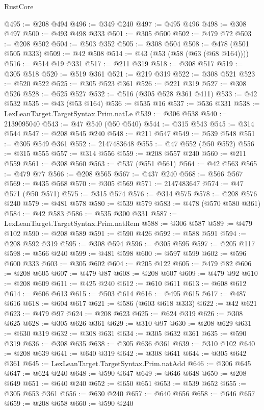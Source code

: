 \begin{lexlean}{RustCore}
\begin{coremodule}
@495 := @208 @494
@496 := @349 @240
@497 := @495 @496
@498 := @308 @497
@500 := @493 @498 @333
@501 := @305 @500
@502 := @479 @72
@503 := @208 @502
@504 := @503 @352
@505 := @308 @504
@508 := @478 (@501 @505 @333)
@509 := @42 @508
@514 := @43 (@53 (@58 (@63 (@68 @164))))
@516 := @514 @19 @331
@517 := @211 @319
@518 := @308 @517
@519 := @305 @518
@520 := @519 @361
@521 := @219 @319
@522 := @308 @521
@523 := @520 @522
@525 := @305 @523 @361
@526 := @221 @319
@527 := @308 @526
@528 := @525 @527
@532 := @516 (@305 @528 @361 @411)
@533 := @42 @532
@535 := @43 (@53 @164)
@536 := @535 @16
@537 := @536 @331
@538 := LexLeanTarget.TargetSyntax.Prim.natLe
@539 := @306 @538
@540 := 2139095040
@543 := @47 @540 (@50 @540)
@544 := @315 @543
@545 := @314 @544
@547 := @208 @545 @240
@548 := @211 @547
@549 := @539 @548
@551 := @305 @549 @361
@552 := 2147483648
@555 := @47 @552 (@50 @552)
@556 := @315 @555
@557 := @314 @556
@559 := @208 @557 @240
@560 := @211 @559
@561 := @308 @560
@563 := @537 (@551 @561)
@564 := @42 @563
@565 := @479 @77
@566 := @208 @565
@567 := @437 @240
@568 := @566 @567
@569 := @435 @568
@570 := @305 @569
@571 := 2147483647
@574 := @47 @571 (@50 @571)
@575 := @315 @574
@576 := @314 @575
@578 := @208 @576 @240
@579 := @481 @578
@580 := @539 @579
@583 := @478 (@570 @580 @361)
@584 := @42 @583
@586 := @535 @300 @331
@587 := LexLeanTarget.TargetSyntax.Prim.natRem
@588 := @306 @587
@589 := @479 @102
@590 := @208 @589
@591 := @590 @426
@592 := @588 @591
@594 := @208 @592 @319
@595 := @308 @594
@596 := @305 @595
@597 := @205 @117
@598 := @566 @240
@599 := @481 @598
@600 := @597 @599
@602 := @596 @600 @333
@603 := @305 @602
@604 := @205 @122
@605 := @479 @82
@606 := @208 @605
@607 := @479 @87
@608 := @208 @607
@609 := @479 @92
@610 := @208 @609
@611 := @425 @240
@612 := @610 @611
@613 := @608 @612
@614 := @606 @613
@615 := @503 @614
@616 := @495 @615
@617 := @487 @616
@618 := @604 @617
@621 := @586 (@603 @618 @333)
@622 := @42 @621
@623 := @479 @97
@624 := @208 @623
@625 := @624 @319
@626 := @308 @625
@628 := @305 @626 @361
@629 := @310 @97
@630 := @208 @629
@631 := @630 @319
@632 := @308 @631
@634 := @305 @632 @361
@635 := @590 @319
@636 := @308 @635
@638 := @305 @636 @361
@639 := @310 @102
@640 := @208 @639
@641 := @640 @319
@642 := @308 @641
@644 := @305 @642 @361
@645 := LexLeanTarget.TargetSyntax.Prim.natAdd
@646 := @306 @645
@647 := @624 @240
@648 := @590 @647
@649 := @646 @648
@650 := @208 @649
@651 := @640 @240
@652 := @650 @651
@653 := @539 @652
@655 := @305 @653 @361
@656 := @630 @240
@657 := @640 @656
@658 := @646 @657
@659 := @208 @658
@660 := @590 @240

\end{coremodule}
\end{lexlean}
